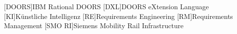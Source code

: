 
\begin{acronym}
	[DOORS]{IBM Rational DOORS}
	[DXL]{DOORS eXtension Language}
	[KI]{Künstliche Intelligenz}
	[RE]{Requirements Engineering}
	[RM]{Requirements Management}
	[SMO RI]{Siemens Mobility Rail Infrastructure}
\end{acronym}


